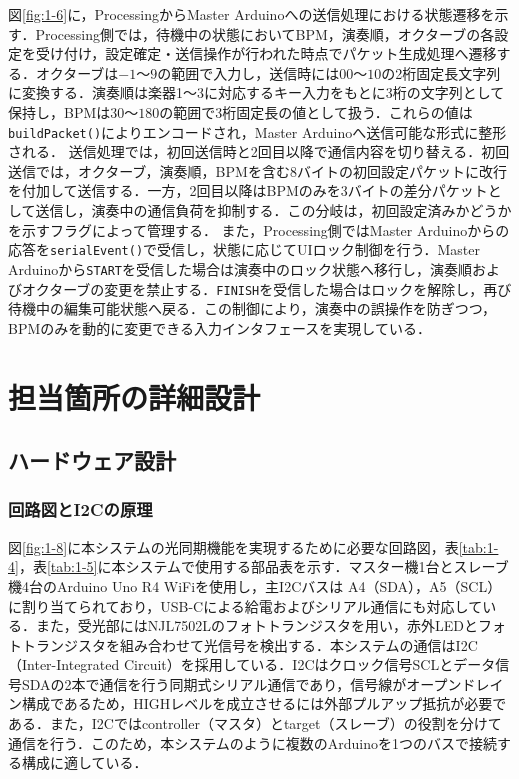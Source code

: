 \documentclass[uplatex,dvipdfmx]{jlreq}
\begin{document}
図\ref{fig:1-6}に，ProcessingからMaster Arduinoへの送信処理における状態遷移を示す．Processing側では，待機中の状態においてBPM，演奏順，オクターブの各設定を受け付け，設定確定・送信操作が行われた時点でパケット生成処理へ遷移する．オクターブは$-1$〜$9$の範囲で入力し，送信時には$00$〜$10$の2桁固定長文字列に変換する．演奏順は楽器1〜3に対応するキー入力をもとに3桁の文字列として保持し，BPMは$30$〜$180$の範囲で3桁固定長の値として扱う．これらの値は\texttt{buildPacket()}によりエンコードされ，Master Arduinoへ送信可能な形式に整形される．
送信処理では，初回送信時と2回目以降で通信内容を切り替える．初回送信では，オクターブ，演奏順，BPMを含む8バイトの初回設定パケットに改行を付加して送信する．一方，2回目以降はBPMのみを3バイトの差分パケットとして送信し，演奏中の通信負荷を抑制する．この分岐は，初回設定済みかどうかを示すフラグによって管理する．
また，Processing側ではMaster Arduinoからの応答を\texttt{serialEvent()}で受信し，状態に応じてUIロック制御を行う．Master Arduinoから\texttt{START}を受信した場合は演奏中のロック状態へ移行し，演奏順およびオクターブの変更を禁止する．\texttt{FINISH}を受信した場合はロックを解除し，再び待機中の編集可能状態へ戻る．この制御により，演奏中の誤操作を防ぎつつ，BPMのみを動的に変更できる入力インタフェースを実現している．

\newpage

\section{担当箇所の詳細設計}
\subsection{ハードウェア設計}
\subsubsection{回路図とI2Cの原理}
図\ref{fig:1-8}に本システムの光同期機能を実現するために必要な回路図，表\ref{tab:1-4}，表\ref{tab:1-5}に本システムで使用する部品表を示す．マスター機1台とスレーブ機4台のArduino Uno R4 WiFiを使用し，主I2Cバスは A4（SDA），A5（SCL）に割り当てられており，USB-Cによる給電およびシリアル通信にも対応している\cite{ref:1-4}．また，受光部にはNJL7502Lのフォトトランジスタを用い，赤外LEDとフォトトランジスタを組み合わせて光信号を検出する．本システムの通信はI2C（Inter-Integrated Circuit）を採用している．I2Cはクロック信号SCLとデータ信号SDAの2本で通信を行う同期式シリアル通信であり，信号線がオープンドレイン構成であるため，HIGHレベルを成立させるには外部プルアップ抵抗が必要である．また，I2Cではcontroller（マスタ）とtarget（スレーブ）の役割を分けて通信を行う．このため，本システムのように複数のArduinoを1つのバスで接続する構成に適している\cite{ref:1-5}．
\end{document}
